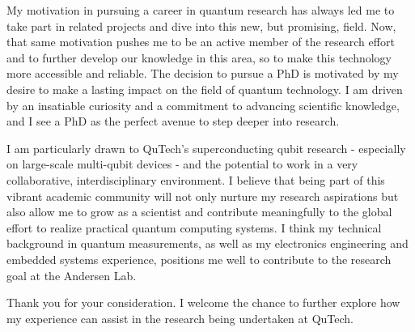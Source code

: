\documentclass[10pt,stdletter,dateno]{newlfm}
\begin{document}
\begin{newlfm}
        My motivation in pursuing a career in quantum research has always led me to take part in related projects and dive into this new, but promising, field. Now, that same motivation pushes me to be an active member of the research effort and to further develop our knowledge in this area, so to make this technology more accessible and reliable. The decision to pursue a PhD is motivated by my desire to make a lasting impact on the field of quantum technology. I am driven by an insatiable curiosity and a commitment to advancing scientific knowledge, and I see a PhD as the perfect avenue to step deeper into research.
        
        I am particularly drawn to QuTech's superconducting qubit research - especially on large-scale multi-qubit devices - and the potential to work in a very collaborative, interdisciplinary environment. I believe that being part of this vibrant academic community will not only nurture my research aspirations but also allow me to grow as a scientist and contribute meaningfully to the global effort to realize practical quantum computing systems. I think my technical background in quantum measurements, as well as my electronics engineering and embedded systems experience, positions me well to contribute to the research goal at the Andersen Lab.
        
        Thank you for your consideration. I welcome the chance to further explore how my experience can assist in the research being undertaken at QuTech.
        
    \end{newlfm}
\end{document}
